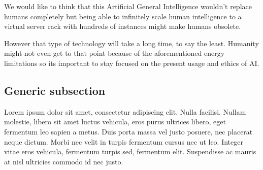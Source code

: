 \documentclass[letterpaper,11pt,leqno]{article}
\begin{document}
We would like to think that this Artificial General Intelligence wouldn't replace humans completely but being able to infinitely scale human intelligence to a virtual server rack with hundreds of instances might make humans obsolete.

However that type of technology will take a long time, to say the least. Humanity might not even get to that point because of the aforementioned energy limitations so its important to stay focused on the present usage and ethics of AI.

\subsection{Generic subsection}

Lorem ipsum dolor sit amet, consectetur adipiscing elit. Nulla facilisi. Nullam molestie, libero sit amet luctus vehicula, eros purus ultrices libero, eget fermentum leo sapien a metus. Duis porta massa vel justo posuere, nec placerat neque dictum. Morbi nec velit in turpis fermentum cursus nec ut leo. Integer vitae eros vehicula, fermentum turpis sed, fermentum elit. Suspendisse ac mauris at nisl ultricies commodo id nec justo.

\pagebreak

\printbibliography
\end{document}
